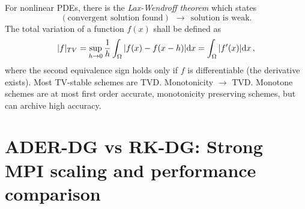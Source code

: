 \noindent
For nonlinear PDEs, there is the \emph{Lax-Wendroff theorem} which states
\begin{equation}
(\text{convergent solution found})~~\rightarrow~~\text{solution is weak.}
\end{equation}
The total variation of a function $f(x)$ shall be defined as
\begin{equation}
|f|_{TV} = \sup_{h\to 0} 
\frac 1 h  \int_\Omega | f(x) - f(x-h) | \mathrm{d} x
= \int_\Omega |f'(x)|  \mathrm{d} x
\,,
\end{equation}
where the second equivalence sign holds only if $f$ is differentiable
(\ie the derivative exists). Most TV-stable schemes are TVD. Monotonicity
$\rightarrow$ TVD. Monotone schemes are at most first order accurate,
monotonicity preserving schemes, but can archive high accuracy.

\section[ADER vs. Runge-Kutta for time integration]
  {ADER-DG vs RK-DG: Strong MPI scaling and performance comparison}
\label{sec:rkdg-performance}


